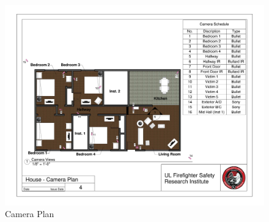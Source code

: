 \begin{figure}
\includegraphics[width=\textheight]{../0_Images/Appendix_Figures/Camera_Plan}
\caption[]{Camera Plan}
\label{fig:appendix_cameras}
\end{figure}
